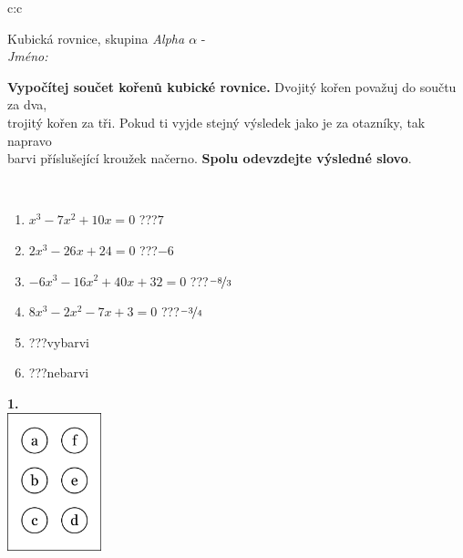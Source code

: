 \documentclass[10pt]{report}
\begin{document}
\thispagestyle{empty}
\begin{tabular}{c:c}
\begin{minipage}[c][104.5mm][t]{0.5\linewidth}
\begin{center}
\vspace{7mm}
{\huge Kubická rovnice, skupina \textit{Alpha $\alpha$} -}\\[5mm]
\textit{Jméno:}\phantom{xxxxxxxxxxxxxxxxxxxxxxxxxxxxxxxxxxxxxxxxxxxxxxxxxxxxxxxxxxxxxxxxx}\\[5mm]
\begin{minipage}{0.95\linewidth}
\begin{center}
\textbf{Vypočítej součet kořenů kubické rovnice.} Dvojitý kořen považuj do součtu za dva,\\trojitý kořen za tři. Pokud ti vyjde stejný výsledek jako je za otazníky, tak napravo\\barvi příslušející kroužek načerno. \textbf{Spolu odevzdejte výsledné slovo}.
\end{center}
\end{minipage}
\\[1mm]
\begin{minipage}{0.79\linewidth}
\begin{center}
\begin{varwidth}{\linewidth}
\begin{enumerate}
\Large
\item $x^3-7x^2+10x=0$\quad \dotfill\; ???\;\dotfill \quad $7$
\item $2x^3-26x+24=0$\quad \dotfill\; ???\;\dotfill \quad $-6$
\item $-6x^3-16x^2+40x+32=0$\quad \dotfill\; ???\;\dotfill \quad $\nicefrac{-8}{3}$
\item $8x^3-2x^2-7x+3=0$\quad \dotfill\; ???\;\dotfill \quad $\nicefrac{-3}{4}$
\item \quad \dotfill\; ???\;\dotfill \quad vybarvi
\item \quad \dotfill\; ???\;\dotfill \quad nebarvi
\end{enumerate}
\end{varwidth}
\end{center}
\end{minipage}
\begin{minipage}{0.20\linewidth}
\begin{center}
{\Huge\bfseries 1.} \\[2mm]
\includegraphics[height=40mm]{../images/braille.png}

\end{center}
\end{minipage}
\end{center}
\end{minipage}
\end{tabular}
\end{document}
